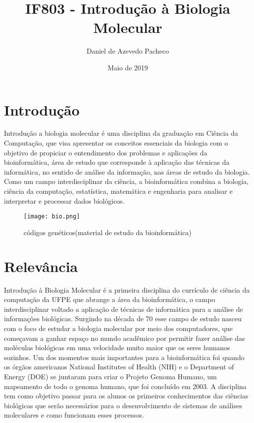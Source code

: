 \documentclass{article}
\title{IF803 - Introdução à Biologia Molecular}
\author{Daniel de Azevedo Pacheco }
\date{Maio de 2019}
\begin{document}
\maketitle

\section{Introdução}
Introdução a biologia molecular é uma disciplina da graduação em Ciência da Computação, que visa apresentar os conceitos essenciais da biologia com o objetivo de propiciar o entendimento dos problemas e aplicações da bioinformática\cite{site}, área de estudo que corresponde à aplicação das técnicas da informática, no sentido de análise da informação, nas áreas de estudo da biologia. Como um campo interdisciplinar da ciência, a bioinformática combina a biologia, ciência da computação, estatística, matemática e engenharia para analisar e interpretar e processar dados biológicos. 
\begin{figure}[h]
    \centering
    \texttt{[image: bio.png]}
    \caption{códigos genéticos(material de estudo da bioinformática) \cite{img}}
    \label{fig:my_label}
\end{figure}
\section{Relevância}
Introdução à Biologia Molecular é a primeira disciplina do currículo de ciência da computação da UFPE que abrange a área da bioinformática, o campo interdisciplinar voltado a aplicação de técnicas de informática para a análise de informações biológicas. Surgindo na década de 70 esse campo de estudo nasceu com o foco de estudar a biologia molecular por meio dos computadores, que começavam a ganhar espaço no mundo acadêmico por permitir fazer análise das moléculas biológicas em uma velocidade muito maior que os seres humanos sozinhos\cite{slide1}.
Um dos momentos mais importantes para a bioinformática foi quando os órgãos americanos National Institutes of Health (NIH) e o Department of Energy (DOE) se juntaram para criar o Projeto Genoma Humano, um mapeamento de todo o genoma humano, que foi concluído em 2003.\cite{slide2}
A disciplina tem como objetivo passar para os alunos os primeiros conhecimentos das ciências biológicas que serão necessários para o desenvolvimento de sistemas de análises moleculares e como funcionam esses processos.
\end{document}
